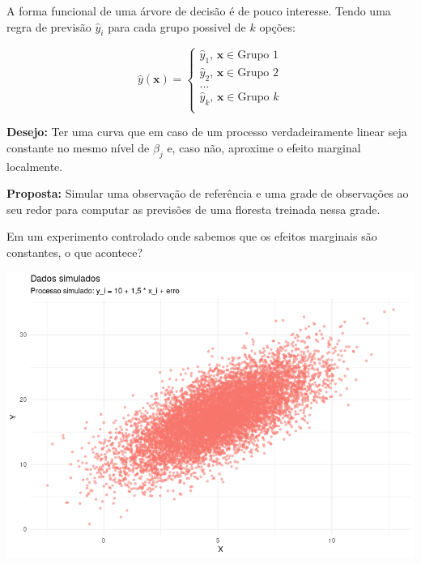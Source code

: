 \documentclass{beamer} %
\newcommand{\1}{\mathbb{I}}
\begin{document}
\begin{frame}

A forma funcional de uma árvore de decisão é de pouco interesse. Tendo uma regra de previsão $\hat{y}_i$ para cada grupo possivel de $k$ opções:

\[
    \hat{y}(\mathbf{x}) = \left.
    \begin{cases}
    \hat{y}_1  ,\,\mathbf{x} \in \text{Grupo 1} \\
    \hat{y}_2  , \,\mathbf{x} \in \text{Grupo 2} \\
    ...\\
    \hat{y}_k  ,\, \mathbf{x} \in \text{Grupo $k$}\\
    \end{cases}
    
\]
   
\end{frame}


\begin{frame}

\textbf{Desejo:} Ter uma curva que em caso de um processo verdadeiramente linear seja constante no mesmo nível de $\beta_j$ e, caso não, aproxime o efeito marginal localmente.
\newline

\textbf{Proposta:} Simular uma observação de referência e uma grade de observações ao seu redor para computar as previsões de uma floresta treinada nessa grade.


\end{frame}

\begin{frame}
Em um experimento controlado onde sabemos que os efeitos marginais são constantes, o que acontece?

\includegraphics[scale = .50]{imagens/exemplo_freddy_fake_data.png}
    
\end{frame}
\end{document}
